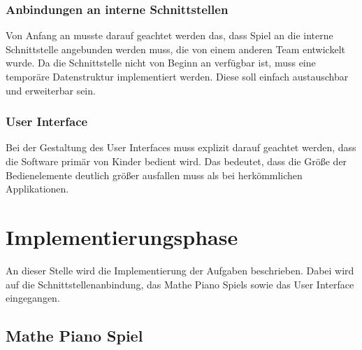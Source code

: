 \subsubsection{Anbindungen an interne Schnittstellen}
Von Anfang an musste darauf geachtet werden das, dass Spiel an die interne Schnittstelle angebunden werden muss, die von einem anderen Team entwickelt wurde. Da die Schnittstelle nicht von Beginn an verfügbar ist, muss eine temporäre Datenstruktur implementiert werden. Diese soll einfach austauschbar und erweiterbar sein.
\subsubsection{User Interface}
Bei der Gestaltung des User Interfaces muss explizit darauf geachtet werden, dass die Software primär von Kinder bedient wird. Das bedeutet, dass die Größe der Bedienelemente deutlich größer ausfallen muss als bei herkömmlichen Applikationen.   

\section{Implementierungsphase}
An dieser Stelle wird die Implementierung der Aufgaben beschrieben. Dabei wird auf die Schnittstellenanbindung, das Mathe Piano Spiels sowie das User Interface eingegangen.
\subsection{Mathe Piano Spiel}




